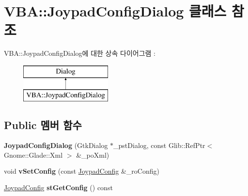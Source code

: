 \hypertarget{class_v_b_a_1_1_joypad_config_dialog}{}\section{V\+BA\+:\+:Joypad\+Config\+Dialog 클래스 참조}
\label{class_v_b_a_1_1_joypad_config_dialog}
V\+BA\+:\+:Joypad\+Config\+Dialog에 대한 상속 다이어그램 \+: \begin{figure}[H]
\begin{center}
\leavevmode
\includegraphics[height=2.000000cm]{class_v_b_a_1_1_joypad_config_dialog}
\end{center}
\end{figure}
\subsection*{Public 멤버 함수}
\begin{DoxyCompactItemize}
\item 
\mbox{\label{class_v_b_a_1_1_joypad_config_dialog_a056ae385dbbaa2eef8e8b8913da72b79}} 
{\bfseries Joypad\+Config\+Dialog} (Gtk\+Dialog $\ast$\+\_\+pst\+Dialog, const Glib\+::\+Ref\+Ptr$<$ Gnome\+::\+Glade\+::\+Xml $>$ \&\+\_\+po\+Xml)
\item 
\mbox{\label{class_v_b_a_1_1_joypad_config_dialog_a287e47a32aec963efaa309b8f031268b}} 
void {\bfseries v\+Set\+Config} (const \mbox{\hyperlink{class_v_b_a_1_1_joypad_config}{Joypad\+Config}} \&\+\_\+ro\+Config)
\item 
\mbox{\label{class_v_b_a_1_1_joypad_config_dialog_a8b45cad0f50bcd7ec3b422d2e535f645}} 
\mbox{\hyperlink{class_v_b_a_1_1_joypad_config}{Joypad\+Config}} {\bfseries st\+Get\+Config} () const
\end{DoxyCompactItemize}
